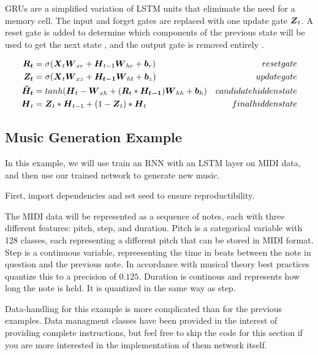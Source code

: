 \documentclass{article}
\begin{document}
GRUs are a simplified variation of LSTM units that elimimate the need for a memory cell. The input and forget gates are replaced with one update gate \(\vb*{Z}_t\). A reset gate is added to determine which components of the previous state will be used to get the next state \cite{hands-on-ml}, and the output gate is removed entirely \cite{pml1book}.

\begin{align*}
    \vb*{R_t} &= \sigma(\vb*{X}_t\vb*{W}_{xr} + \vb*{H}_{t-1}\vb*{W}_{hr} + \vb*{b}_r) & reset gate \\
    \vb*{Z_t} &= \sigma(\vb*{X}_t\vb*{W}_{xz} + \vb*{H_{t-1}}\vb*{W}_{ht} + \vb*{b}_z) & update gate \\
    \vb*{\tilde{H}_t} &= tanh(\vb*{H}_t - \vb*{W}_{xh} + (\vb*{R}_t * \vb*{H_{t-1}})\vb*{W}_{hh} + \vb*{b}_h) & candidate hidden state \\
    \vb*{H}_t &= \vb*{Z}_t * \vb*{H}_{t-1} + (1 - \vb*{Z}_t)*\vb*{H}_t & final hidden state \\
\end{align*}

\subsection{Music Generation Example}

In this example, we will use train an RNN with an LSTM layer on MIDI data, and then use our trained network to generate new music.

First, import dependencies and set seed to ensure reproductibility.



The MIDI data will be represented as a sequence of notes, each with three different features: pitch, step, and duration. Pitch is a categorical variable with 128 classes, each representing a different pitch that can be stored in MIDI format. Step is a continuous variable, repreesenting the time in beats between the note in question and the previous note. In accordance with musical theory best practices quantize this to a precision of \(0.125\). Duration is continous and represents how long the note is held. It is quantized in the same way as step.

Data-handling for this example is more complicated than for the previous examples. Data managment classes have been provided in the interest of providing complete instructions, but feel free to skip the code for this section if you are more interested in the implementation of them network itself. 
\end{document}
